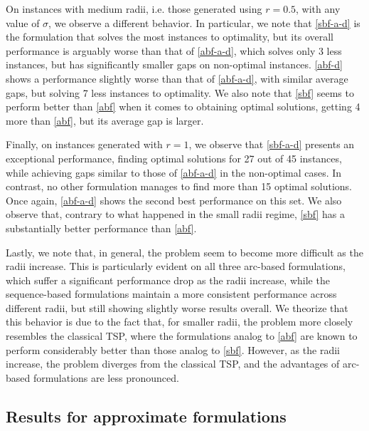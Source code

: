 \documentclass[pdflatex,sn-mathphys-num]{sn-jnl}%
\begin{document}
On instances with medium radii, i.e. those generated using $r=0.5$, with any value of $\sigma$, we observe a different behavior. In particular, we note that \ref{sbf-a-d} is the formulation that solves the most instances to optimality, but its overall performance is arguably worse than that of \ref{abf-a-d}, which solves only 3 less instances, but has significantly smaller gaps on non-optimal instances. \ref{abf-d} shows a performance slightly worse than that of \ref{abf-a-d}, with similar average gaps, but solving 7 less instances to optimality. We also note that \ref{sbf} seems to perform better than \ref{abf} when it comes to obtaining optimal solutions, getting 4 more than \ref{abf}, but its average gap is larger.

Finally, on instances generated with $r=1$, we observe that \ref{sbf-a-d} presents an exceptional performance, finding optimal solutions for 27 out of 45 instances, while achieving gaps similar to those of \ref{abf-a-d} in the non-optimal cases. In contrast, no other formulation manages to find more than 15 optimal solutions. Once again, \ref{abf-a-d} shows the second best performance on this set. We also observe that, contrary to what happened in the small radii regime, \ref{sbf} has a substantially better performance than \ref{abf}.

Lastly, we note that, in general, the problem seem to become more difficult as the radii increase. This is particularly evident on all three arc-based formulations, which suffer a significant performance drop as the radii increase, while the sequence-based formulations maintain a more consistent performance across different radii, but still showing slightly worse results overall. We theorize that this behavior is due to the fact that, for smaller radii, the problem more closely resembles the classical TSP, where the formulations analog to \ref{abf} are known to perform considerably better than those analog to \ref{sbf}. However, as the radii increase, the problem diverges from the classical TSP, and the advantages of arc-based formulations are less pronounced.

\subsection{Results for approximate formulations}
\end{document}
